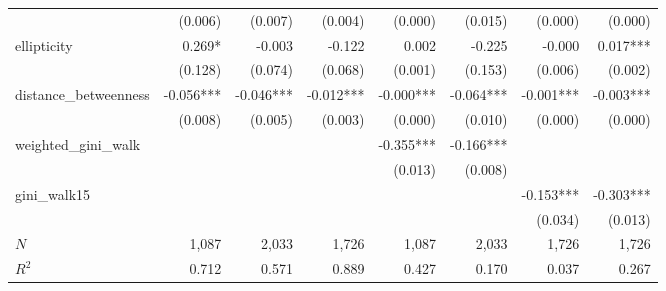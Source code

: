 \begin{tabular}{lrrrrrrr}
                      &                      (0.006) &                    (0.007) &                      (0.004) &                      (0.000) &                    (0.015) &                              (0.000) &                              (0.000) \\ 
ellipticity           &                       0.269* &                     -0.003 &                       -0.122 &                        0.002 &                     -0.225 &                               -0.000 &                             0.017*** \\ 
                      &                      (0.128) &                    (0.074) &                      (0.068) &                      (0.001) &                    (0.153) &                              (0.006) &                              (0.002) \\ 
distance\_betweenness &                    -0.056*** &                  -0.046*** &                    -0.012*** &                    -0.000*** &                  -0.064*** &                            -0.001*** &                            -0.003*** \\ 
                      &                      (0.008) &                    (0.005) &                      (0.003) &                      (0.000) &                    (0.010) &                              (0.000) &                              (0.000) \\ 
weighted\_gini\_walk  &                              &                            &                              &                    -0.355*** &                  -0.166*** &                                      &                                      \\ 
                      &                              &                            &                              &                      (0.013) &                    (0.008) &                                      &                                      \\ 
gini\_walk15          &                              &                            &                              &                              &                            &                            -0.153*** &                            -0.303*** \\ 
                      &                              &                            &                              &                              &                            &                              (0.034) &                              (0.013) \\ 
\midrule
$N$                   &                        1,087 &                      2,033 &                        1,726 &                        1,087 &                      2,033 &                                1,726 &                                1,726 \\ 
$R^2$                 &                        0.712 &                      0.571 &                        0.889 &                        0.427 &                      0.170 &                                0.037 &                                0.267 \\ 
\bottomrule
\end{tabular}
